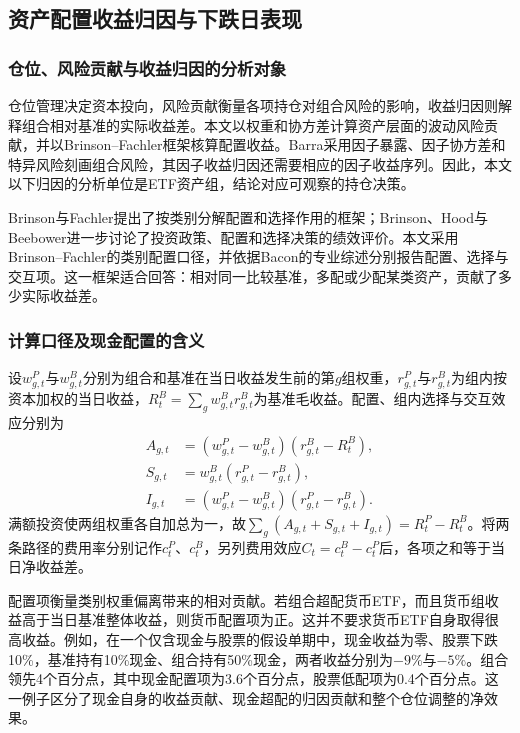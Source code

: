 \subsection{资产配置收益归因与下跌日表现}
\label{sec:brinson}
\subsubsection{仓位、风险贡献与收益归因的分析对象}
仓位管理决定资本投向，风险贡献衡量各项持仓对组合风险的影响，收益归因则解释组合相对基准的实际收益差。本文以权重和协方差计算资产层面的波动风险贡献，并以Brinson--Fachler框架核算配置收益。Barra采用因子暴露、因子协方差和特异风险刻画组合风险，其因子收益归因还需要相应的因子收益序列\cite{msci2026factor}。因此，本文以下归因的分析单位是ETF资产组，结论对应可观察的持仓决策。

Brinson与Fachler提出了按类别分解配置和选择作用的框架\cite{brinson1985measuring}；Brinson、Hood与Beebower进一步讨论了投资政策、配置和选择决策的绩效评价\cite{brinson1986determinants}。本文采用Brinson--Fachler的类别配置口径，并依据Bacon的专业综述分别报告配置、选择与交互项\cite{bacon2019attribution}。这一框架适合回答：相对同一比较基准，多配或少配某类资产，贡献了多少实际收益差。

\subsubsection{计算口径及现金配置的含义}
设$w^P_{g,t}$与$w^B_{g,t}$分别为组合和基准在当日收益发生前的第$g$组权重，$r^P_{g,t}$与$r^B_{g,t}$为组内按资本加权的当日收益，$R^B_t=\sum_g w^B_{g,t}r^B_{g,t}$为基准毛收益。配置、组内选择与交互效应分别为
\begin{align}
A_{g,t}&=(w^P_{g,t}-w^B_{g,t})(r^B_{g,t}-R^B_t),\\
S_{g,t}&=w^B_{g,t}(r^P_{g,t}-r^B_{g,t}),\\
I_{g,t}&=(w^P_{g,t}-w^B_{g,t})(r^P_{g,t}-r^B_{g,t}).
\end{align}
满额投资使两组权重各自加总为一，故$\sum_g(A_{g,t}+S_{g,t}+I_{g,t})=R^P_t-R^B_t$。将两条路径的费用率分别记作$c^P_t$、$c^B_t$，另列费用效应$C_t=c^B_t-c^P_t$后，各项之和等于当日净收益差。

配置项衡量类别权重偏离带来的相对贡献。若组合超配货币ETF，而且货币组收益高于当日基准整体收益，则货币配置项为正。这并不要求货币ETF自身取得很高收益。例如，在一个仅含现金与股票的假设单期中，现金收益为零、股票下跌10\%，基准持有10\%现金、组合持有50\%现金，两者收益分别为$-9\%$与$-5\%$。组合领先4个百分点，其中现金配置项为3.6个百分点，股票低配项为0.4个百分点。这一例子区分了现金自身的收益贡献、现金超配的归因贡献和整个仓位调整的净效果。


